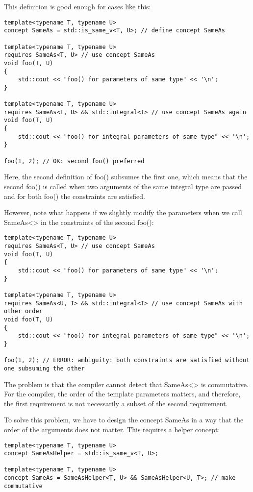 This definition is good enough for cases like this:

\begin{lstlisting}[style=styleCXX]
template<typename T, typename U>
concept SameAs = std::is_same_v<T, U>; // define concept SameAs

template<typename T, typename U>
requires SameAs<T, U> // use concept SameAs
void foo(T, U)
{
	std::cout << "foo() for parameters of same type" << '\n';
}

template<typename T, typename U>
requires SameAs<T, U> && std::integral<T> // use concept SameAs again
void foo(T, U)
{
	std::cout << "foo() for integral parameters of same type" << '\n';
}

foo(1, 2); // OK: second foo() preferred
\end{lstlisting}

Here, the second definition of foo() subsumes the first one, which means that the second foo() is called when two arguments of the same integral type are passed and for both foo() the constraints are satisfied.

However, note what happens if we slightly modify the parameters when we call SameAs<> in the constraints of the second foo():

\begin{lstlisting}[style=styleCXX]
template<typename T, typename U>
requires SameAs<T, U> // use concept SameAs
void foo(T, U)
{
	std::cout << "foo() for parameters of same type" << '\n';
}

template<typename T, typename U>
requires SameAs<U, T> && std::integral<T> // use concept SameAs with other order
void foo(T, U)
{
	std::cout << "foo() for integral parameters of same type" << '\n';
}

foo(1, 2); // ERROR: ambiguity: both constraints are satisfied without one subsuming the other
\end{lstlisting}

The problem is that the compiler cannot detect that SameAs<> is commutative. For the compiler, the order of the template parameters matters, and therefore, the first requirement is not necessarily a subset of the second requirement.

To solve this problem, we have to design the concept SameAs in a way that the order of the arguments does not matter. This requires a helper concept:

\begin{lstlisting}[style=styleCXX]
template<typename T, typename U>
concept SameAsHelper = std::is_same_v<T, U>;

template<typename T, typename U>
concept SameAs = SameAsHelper<T, U> && SameAsHelper<U, T>; // make commutative
\end{lstlisting}


